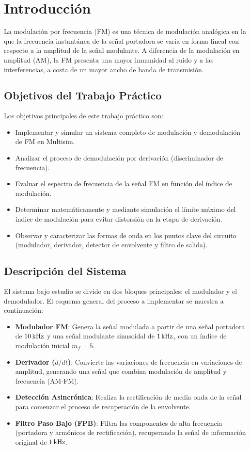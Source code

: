 \chapter{Introducción}
\label{sec.ej2:introduccion}

La modulación por frecuencia (FM) es una técnica de modulación analógica en la que la frecuencia
instantánea de la señal portadora se varía en forma lineal con respecto a la amplitud de la señal
modulante. A diferencia de la modulación en amplitud (AM), la FM presenta una mayor inmunidad al
ruido y a las interferencias, a costa de un mayor ancho de banda de transmisión.

\section{Objetivos del Trabajo Práctico}
Los objetivos principales de este trabajo práctico son:
\begin{itemize}
    \item Implementar y simular un sistema completo de modulación y demodulación de FM en Multisim.
    \item Analizar el proceso de demodulación por derivación (discriminador de frecuencia).
    \item Evaluar el espectro de frecuencia de la señal FM en función del índice de modulación.
    \item Determinar matemáticamente y mediante simulación el límite máximo del índice de modulación
          para evitar distorsión en la etapa de derivación.
    \item Observar y caracterizar las formas de onda en los puntos clave del circuito (modulador,
          derivador, detector de envolvente y filtro de salida).
\end{itemize}

\section{Descripción del Sistema}
El sistema bajo estudio se divide en dos bloques principales: el modulador y el demodulador. El
esquema general del proceso a implementar se muestra a continuación:
\begin{itemize}
    \item \textbf{Modulador FM}: Genera la señal modulada a partir de una señal portadora de
          $10\,\mathrm{kHz}$ y una señal modulante sinusoidal de $1\,\mathrm{kHz}$, con un índice de modulación inicial
          $m_f = 5$.
    \item \textbf{Derivador ($d/dt$)}: Convierte las variaciones de frecuencia en variaciones de
          amplitud, generando una señal que combina modulación de amplitud y frecuencia (AM-FM).
    \item \textbf{Detección Asincrónica}: Realiza la rectificación de media onda de la señal para
          comenzar el proceso de recuperación de la envolvente.
    \item \textbf{Filtro Paso Bajo (FPB)}: Filtra las componentes de alta frecuencia (portadora y
          armónicos de rectificación), recuperando la señal de información original de $1\,\mathrm{kHz}$.
\end{itemize}
